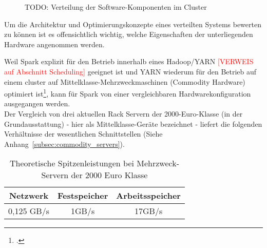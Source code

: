 \begin{figure}[h]
\centering
  \caption{TODO: Verteilung der Software-Komponenten im Cluster}
\end{figure}

Um die Architektur und Optimierungskonzepte eines verteilten Systems bewerten zu können ist es offensichtlich wichtig, welche Eigenschaften der unterliegenden Hardware angenommen werden.

Weil Spark explizit für den Betrieb innerhalb eines Hadoop/YARN \textcolor{red}{[VERWEIS auf Abschnitt Scheduling]} geeignet ist und YARN wiederum für den Betrieb auf einem \gls{cluster} auf Mittelklasse-Mehrzweckmaschinen (Commodity Hardware) optimiert ist\footcite{Mer14}, kann für Spark von einer vergleichbaren Hardwarekonfiguration ausgegangen werden.\\

Der Vergleich von drei aktuellen Rack Servern der 2000-Euro-Klasse (in der Grundausstattung) - hier als Mittelklasse-Geräte bezeichnet - liefert die folgenden Verhältnisse der wesentlichen Schnittstellen (Siehe Anhang~\ref{subsec:commodity_servers}).

\begin{table}[ht]
	\centering %
	\begin{tabular}{c c c} %
		\hline\hline %
		Netzwerk & Festspeicher & Arbeitsspeicher\\ [0.5ex] %
		\hline %
		0,125 GB/s & 1GB/s & 17GB/s \\ %
		\hline %
	\end{tabular}
	\caption{Theoretische Spitzenleistungen bei Mehrzweck-Servern der 2000 Euro Klasse} %
	\label{table:vgldurchsatz} %
\end{table}

